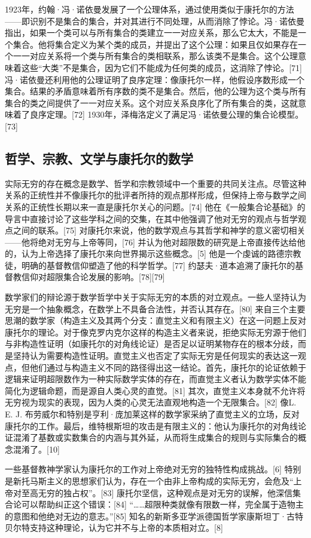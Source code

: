 1923年，约翰·冯·诺依曼发展了一个公理体系，通过使用类似于康托尔的方法——即识别不是集合的集合，并对其进行不同处理，从而消除了悖论。冯·诺依曼指出，如果一个类可以与所有集合的类建立一一对应关系，那么它太大，不能是一个集合。他将集合定义为某个类的成员，并提出了这个公理：如果且仅如果存在一个一一对应关系将一个类与所有集合的类相联系，那么该类不是集合。这个公理意味着这些“大类”不是集合，因为它们不能成为任何类的成员，这消除了悖论。[71] 冯·诺依曼还利用他的公理证明了良序定理：像康托尔一样，他假设序数形成一个集合。结果的矛盾意味着所有序数的类不是集合。然后，他的公理为这个类与所有集合的类之间提供了一一对应关系。这个对应关系良序化了所有集合的类，这就意味着了良序定理。[72] 1930年，泽梅洛定义了满足冯·诺依曼公理的集合论模型。[73]
\subsection{哲学、宗教、文学与康托尔的数学}
实际无穷的存在概念是数学、哲学和宗教领域中一个重要的共同关注点。尽管这种关系的正统性并不像康托尔的批评者所持的观点那样形成，但保持上帝与数学之间关系的正统性长期以来一直是康托尔关心的问题。[74] 他在《一般集合论基础》的导言中直接讨论了这些学科之间的交集，在其中他强调了他对无穷的观点与哲学观点之间的联系。[75] 对康托尔来说，他的数学观点与其哲学和神学的意义密切相关——他将绝对无穷与上帝等同，[76] 并认为他对超限数的研究是上帝直接传达给他的，认为上帝选择了康托尔来向世界揭示这些概念。[5] 他是一个虔诚的路德宗教徒，明确的基督教信仰塑造了他的科学哲学。[77] 约瑟夫·道本追溯了康托尔的基督教信仰对超限集合论发展的影响。[78][79]

数学家们的辩论源于数学哲学中关于实际无穷的本质的对立观点。一些人坚持认为无穷是一个抽象概念，在数学上不具备合法性，并否认其存在。[80] 来自三个主要思潮的数学家（构造主义及其两个分支：直觉主义和有限主义）在这一问题上反对康托尔的理论。对于像克罗内克尔这样的构造主义者来说，拒绝实际无穷源于他们与非构造性证明（如康托尔的对角线论证）是否足以证明某物存在的根本分歧，而是坚持认为需要构造性证明。直觉主义也否定了实际无穷是任何现实的表达这一观点，但他们通过与构造主义不同的路径得出这一结论。首先，康托尔的论证依赖于逻辑来证明超限数作为一种实际数学实体的存在，而直觉主义者认为数学实体不能简化为逻辑命题，而是源自人类心灵的直觉。[81] 其次，直觉主义本身就不允许将无穷视为现实的表现，因为人类的心灵无法直观地构造一个无限集合。[82] 像L. E. J. 布劳威尔和特别是亨利·庞加莱这样的数学家采纳了直觉主义的立场，反对康托尔的工作。最后，维特根斯坦的攻击是有限主义的：他认为康托尔的对角线论证混淆了基数或实数集合的内涵与其外延，从而将生成集合的规则与实际集合的概念混淆了。[10]

一些基督教神学家认为康托尔的工作对上帝绝对无穷的独特性构成挑战。[6] 特别是新托马斯主义的思想家们认为，存在一个由非上帝构成的实际无穷，会危及“上帝对至高无穷的独占权”。[83] 康托尔坚信，这种观点是对无穷的误解，他深信集合论可以帮助纠正这个错误：[84] “……超限种类就像有限数一样，完全属于造物主的意图和他绝对无边的意志。”[85] 知名的新斯多亚学派德国哲学家康斯坦丁·古特贝尔特支持这种理论，认为它并不与上帝的本质相对立。[8]

